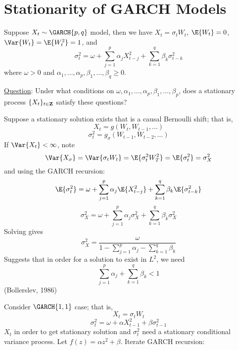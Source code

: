 \section{Stationarity of GARCH Models}
Suppose $ X_t \sim \GARCH{p,q} $ model, then we have
$ X_t=\sigma_t W_t $, $ \E{W_t}=0 $, $ \Var{W_t}=\E{W_t^2}=1 $, and
\[ \sigma_t^2=\omega+\sum_{j=1}^{p} \alpha_j X_{t-j}^2+\sum_{k=1}^{q}\beta_k \sigma^2_{t-k}  \]
where $ \omega>0 $ and $ \alpha_1,\ldots,\alpha_p,\beta_1,\ldots,\beta_q \ge 0 $.

\underline{Question}: Under what conditions on $ \omega,\alpha_1,\ldots,\alpha_p,
    \beta_1,\ldots,\beta_p $, does a stationary process $ \{X_t\}_{t\in\mathbf{Z}} $
satisfy these questions?

\begin{Remark}{}{}
    Suppose a stationary solution exists that is a causal Bernoulli shift; that is,
    \[ X_t=g(W_t,W_{t-1},\ldots) \]
    \[ \sigma_t^2=g_\sigma(W_{t-1},W_{t-2},\ldots) \]
    If $ \Var{X_t}<\infty $, note
    \[ \Var{X_\sigma}=\Var{\sigma_t W_t}=\E{\sigma_t^2 W_T^2}=\E{\sigma_t^2}=\sigma_X^2 \]
    and using the GARCH recursion:
    \[ \E{\sigma_t^2}=\omega+\sum_{j=1}^{p} \alpha_j \E{X_{t-j}^2}+\sum_{k=1}^{q} \beta_k \E{\sigma^2_{t-k}} \]
    \[ \sigma_X^2=\omega+\sum_{j=1}^{p} \alpha_j \sigma_X^2 +\sum_{k=1}^{q}\beta_k \sigma^2_X  \]
    Solving gives
    \[ \sigma_X^2=\frac{\omega}{1-\sum_{j=1}^{p} \alpha_j-\sum_{k=1}^{q} \beta_k}  \]
    Suggests that in order for a solution to exist in $ L^2 $, we need
    \[ \sum_{j=1}^{p} \alpha_j + \sum_{k=1}^{q} \beta_k <1 \]
    (Bollerslev, 1986)
\end{Remark}
Consider $ \GARCH{1,1} $ case; that is,
\[ X_t=\sigma_t W_t \]
\[ \sigma_t^2=\omega+\alpha X_{t-1}^2+\beta \sigma_{t-1}^2 \]
$ X_t $ in order to get stationary solution and $ \sigma_t^2 $ need
a stationary conditional variance process. Let $ f(z)=\alpha z^2+\beta $.
Iterate GARCH recursion:
